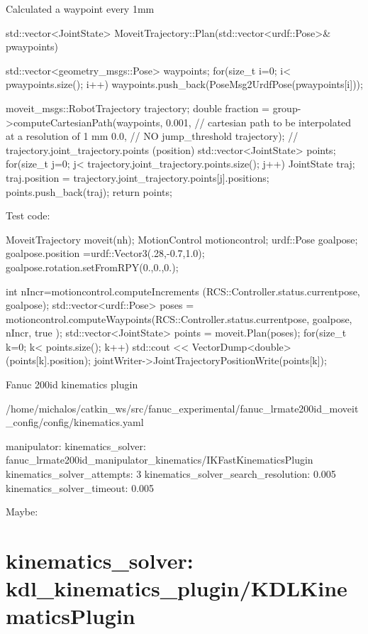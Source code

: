 Calculated a waypoint every 1mm \begin{DoxyVerb}std::vector<JointState> MoveitTrajectory::Plan(std::vector<urdf::Pose>& pwaypoints) {
    std::vector<geometry_msgs::Pose> waypoints;
    for(size_t i=0; i< pwaypoints.size(); i++)
    {    
        waypoints.push_back(PoseMsg2UrdfPose(pwaypoints[i]));
    }

    moveit_msgs::RobotTrajectory trajectory;
    double fraction = group->computeCartesianPath(waypoints,
            0.001, // cartesian path to be interpolated at a resolution of 1 mm 
            0.0, // NO jump_threshold
            trajectory);  // trajectory.joint_trajectory.points  (position)
    std::vector<JointState> points;
    for(size_t j=0; j< trajectory.joint_trajectory.points.size(); j++)
    {
        JointState traj;
        traj.position = trajectory.joint_trajectory.points[j].positions;
        points.push_back(traj);
    }
    return points;
}
\end{DoxyVerb}


Test code\-: \begin{DoxyVerb}       MoveitTrajectory moveit(nh);
        MotionControl motioncontrol;
        urdf::Pose goalpose;
        goalpose.position =urdf::Vector3(.28,-0.7,1.0);
        goalpose.rotation.setFromRPY(0.,0.,0.);

        int nIncr=motioncontrol.computeIncrements (RCS::Controller.status.currentpose, goalpose);
        std::vector<urdf::Pose> poses = motioncontrol.computeWaypoints(RCS::Controller.status.currentpose, goalpose, nIncr, true );
        std::vector<JointState> points = moveit.Plan(poses);
        for(size_t k=0; k< points.size(); k++)
        {
            std::cout <<  VectorDump<double> (points[k].position);
            jointWriter->JointTrajectoryPositionWrite(points[k]);
        }
\end{DoxyVerb}


Fanuc 200id kinematics plugin

/home/michalos/catkin\-\_\-ws/src/fanuc\-\_\-experimental/fanuc\-\_\-lrmate200id\-\_\-moveit\-\_\-config/config/kinematics.yaml \begin{DoxyVerb}manipulator:
  kinematics_solver: fanuc_lrmate200id_manipulator_kinematics/IKFastKinematicsPlugin
  kinematics_solver_attempts: 3
  kinematics_solver_search_resolution: 0.005
  kinematics_solver_timeout: 0.005
\end{DoxyVerb}


Maybe\-: \section*{kinematics\-\_\-solver\-: kdl\-\_\-kinematics\-\_\-plugin/\-K\-D\-L\-Kinematics\-Plugin}


